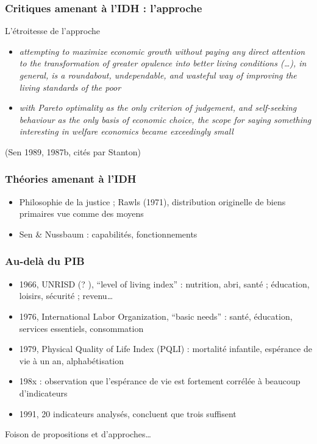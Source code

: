 \documentclass[french]{beamer}
\begin{document}
\begin{frame}
	\frametitle{Critiques amenant à l’IDH : l’approche}
  \begin{block}{L’étroitesse de l’approche}
    \begin{itemize}
      \item \emph{ attempting to maximize economic growth without paying any direct attention to the transformation of greater opulence into better living conditions (…), in general, is a roundabout, undependable, and wasteful way of improving the living standards of the poor}
      \item \emph{with Pareto optimality as the only criterion of judgement, and self-seeking behaviour as the only basis of economic choice, the scope for saying something interesting in welfare economics became exceedingly small}
    \end{itemize}
    {\small (Sen 1989, 1987b, cités par Stanton)}
  \end{block}
\end{frame}

\begin{frame}
	\frametitle{Théories amenant à l’IDH}
  \begin{itemize}
    \item Philosophie de la justice ; Rawls (1971), distribution originelle de biens primaires vue comme des moyens
    \item Sen \& Nussbaum : capabilités, fonctionnements
  \end{itemize}
\end{frame}

\begin{frame}
	\frametitle{Au-delà du PIB}
	\begin{itemize}
		\item 1966, UNRISD (? ), “level of living index” : nutrition, abri, santé ; éducation, loisirs, sécurité ; revenu…
		\item 1976, International Labor Organization, “basic needs” : santé, éducation, services essentiels, consommation
		\item 1979, Physical Quality of Life Index (PQLI) : mortalité infantile, espérance de vie à un an, alphabétisation
		\item 198x : observation que l’espérance de vie est fortement corrélée à beaucoup d’indicateurs
		\item 1991, 20 indicateurs analysés, concluent que trois suffisent
	\end{itemize}
  Foison de propositions et d’approches…
\end{frame}
\end{document}
